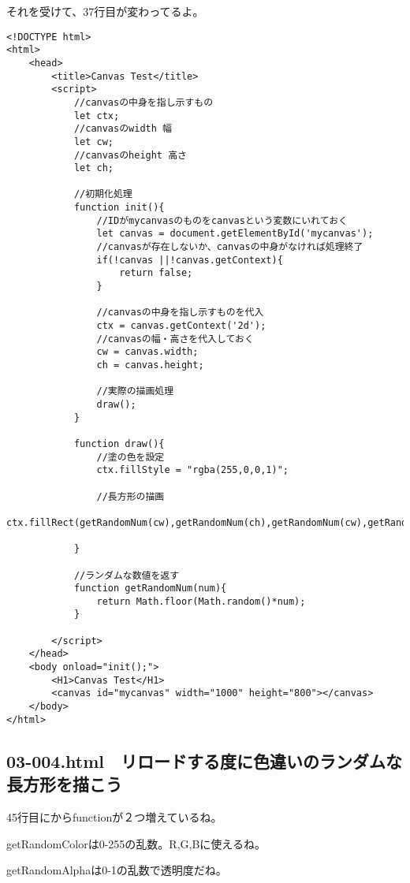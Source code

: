 \documentclass[mingoth,11pt,a4j,uplatex]{jsarticle}
\begin{document}
それを受けて、37行目が変わってるよ。
\begin{lstlisting}[caption=リロードする度にランダムな長方形を描こう]
<!DOCTYPE html>
<html>
	<head>
		<title>Canvas Test</title>
		<script>
			//canvasの中身を指し示すもの
			let ctx;
			//canvasのwidth 幅
			let cw;
			//canvasのheight 高さ
			let ch;
			
			//初期化処理
			function init(){
				//IDがmycanvasのものをcanvasという変数にいれておく
				let canvas = document.getElementById('mycanvas');
				//canvasが存在しないか、canvasの中身がなければ処理終了
				if(!canvas ||!canvas.getContext){
					return false;
				}
				
				//canvasの中身を指し示すものを代入
				ctx = canvas.getContext('2d');
				//canvasの幅・高さを代入しておく
				cw = canvas.width;
				ch = canvas.height;
				
				//実際の描画処理
				draw();
			}
			
			function draw(){
				//塗の色を設定
				ctx.fillStyle = "rgba(255,0,0,1)";
				
				//長方形の描画
				ctx.fillRect(getRandomNum(cw),getRandomNum(ch),getRandomNum(cw),getRandomNum(ch));

			}
			
			//ランダムな数値を返す
			function getRandomNum(num){
				return Math.floor(Math.random()*num);
			}

		</script>
	</head>
	<body onload="init();">
		<H1>Canvas Test</H1>
		<canvas id="mycanvas" width="1000" height="800"></canvas>
	</body>
</html>
\end{lstlisting}

\subsection{03-004.html　リロードする度に色違いのランダムな長方形を描こう}
45行目にからfunctionが２つ増えているね。

getRandomColorは0-255の乱数。R,G,Bに使えるね。

getRandomAlphaは0-1の乱数で透明度だね。
\end{document}
